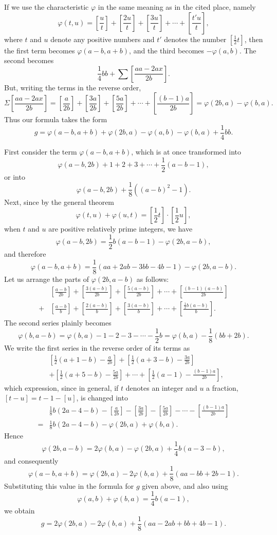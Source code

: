 \documentclass[12pt]{article}
\newcommand{\gbrack}[1]{\left[#1\right]}
\begin{document}
If we use the characteristic $\varphi$ in the same meaning as in the cited place, namely
\[
\varphi(t,u)=\gbrack{\frac{u}{t}}+\gbrack{\frac{2u}{t}}+\gbrack{\frac{3u}{t}}+\cdots+\gbrack{\frac{t'u}{t}},
\]
where $t$ and $u$ denote any positive numbers and $t'$ denotes the number $\gbrack{\frac12t}$, then the first term becomes $\varphi(a-b,a+b)$, and the third becomes $-\varphi(a,b)$. The second becomes
\[
\frac14bb+\sum\gbrack{\frac{aa-2ax}{2b}}.
\]
But, writing the terms in the reverse order,
\[
\Sigma\gbrack{\frac{aa-2ax}{2b}}
=\gbrack{\frac{a}{2b}}+\gbrack{\frac{3a}{2b}}+\gbrack{\frac{5a}{2b}}+\cdots+\gbrack{\frac{(b-1)a}{2b}}
=\varphi(2b,a)-\varphi(b,a).
\]
Thus our formula takes the form
\[
g=\varphi(a-b,a+b)+\varphi(2b,a)-\varphi(a,b)-\varphi(b,a)+\frac14bb.
\]

First consider the term $\varphi(a-b,a+b)$, which is at once transformed into
\[
\varphi(a-b,2b)+1+2+3+\cdots+\frac12(a-b-1),
\]
or into
\[
\varphi(a-b,2b)+\frac18((a-b)^2-1).
\]
Next, since by the general theorem
\[
\varphi(t,u)+\varphi(u,t)=\gbrack{\frac12t}\cdot\gbrack{\frac12u},
\]
when $t$ and $u$ are positive relatively prime integers, we have
\[
\varphi(a-b,2b)=\frac12b(a-b-1)-\varphi(2b,a-b),
\]
and therefore
\[
\varphi(a-b,a+b)=\frac18(aa+2ab-3bb-4b-1)-\varphi(2b,a-b).
\]
Let us arrange the parts of $\varphi(2b,a-b)$ as follows:
\[
\begin{aligned}
&\gbrack{\frac{a-b}{2b}}+\gbrack{\frac{3(a-b)}{2b}}+\gbrack{\frac{5(a-b)}{2b}}+\cdots+\gbrack{\frac{(b-1)(a-b)}{2b}}\\
+{}&\gbrack{\frac{a-b}{b}}+\gbrack{\frac{2(a-b)}{b}}+\gbrack{\frac{3(a-b)}{b}}+\cdots+\gbrack{\frac{\frac12b(a-b)}{b}}.
\end{aligned}
\]
The second series plainly becomes
\[
\varphi(b,a-b)=\varphi(b,a)-1-2-3-\cdots-\frac12b
=\varphi(b,a)-\frac18(bb+2b).
\]
We write the first series in the reverse order of its terms as
\[
\begin{aligned}
&\gbrack{\frac12(a+1-b)-\frac{a}{2b}}
+\gbrack{\frac12(a+3-b)-\frac{3a}{2b}}\\
&+\gbrack{\frac12(a+5-b)-\frac{5a}{2b}}
+\cdots+\gbrack{\frac12(a-1)-\frac{(b-1)a}{2b}},
\end{aligned}
\]
which expression, since in general, if $t$ denotes an integer and $u$ a fraction, $[t-u]=t-1-[u]$, is changed into
\[
\begin{aligned}
&\frac18b(2a-4-b)-\gbrack{\frac{a}{2b}}-\gbrack{\frac{3a}{2b}}
-\gbrack{\frac{5a}{2b}}-\cdots-\gbrack{\frac{(b-1)a}{2b}}\\
={}&\frac18b(2a-4-b)-\varphi(2b,a)+\varphi(b,a).
\end{aligned}
\]
Hence
\[
\varphi(2b,a-b)=2\varphi(b,a)-\varphi(2b,a)+\frac14b(a-3-b),
\]
and consequently
\[
\varphi(a-b,a+b)=\varphi(2b,a)-2\varphi(b,a)+\frac18(aa-bb+2b-1).
\]
Substituting this value in the formula for $g$ given above, and also using
\[
\varphi(a,b)+\varphi(b,a)=\frac14b(a-1),
\]
we obtain
\[
g=2\varphi(2b,a)-2\varphi(b,a)+\frac18(aa-2ab+bb+4b-1).
\]
\end{document}

